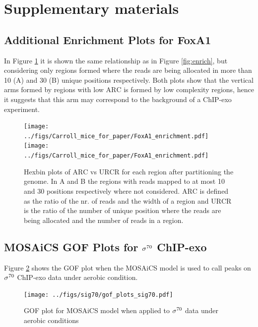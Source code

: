 \documentclass[11pt]{article}\usepackage[]{graphicx}\usepackage[]{color}
\begin{document}
\newpage

\section*{Supplementary materials}
\label{sec:supp}

\subsection*{Additional Enrichment Plots for FoxA1}
\label{sec:enrichsup}

In Figure \ref{fig:enrich2} it is shown the same relationship as in
Figure \ref{fig:enrich}, but considering only regions formed where the
reads are being allocated in more than 10 (A) and 30 (B) unique
positions respectively. Both plots show that the vertical arms formed
by regions with low $\mbox{ARC}$ is formed by low complexity regions,
hence it suggests that this arm may correspond to the background of a
ChIP-exo experiment.

\begin{figure}[h!]
  \centering
  \texttt{[image: ../figs/Carroll\_mice\_for\_paper/FoxA1\_enrichment.pdf]}
  \texttt{[image: ../figs/Carroll\_mice\_for\_paper/FoxA1\_enrichment.pdf]}
  \caption{Hexbin plots of $\mbox{ARC}$ vs $\mbox{URCR}$ for each
    region after partitioning the genome. In A and B the regions with
    reads mapped to at most 10 and 30 positions respectively where not
    considered. $\mbox{ARC}$ is defined as the ratio of the nr. of
    reads and the width of a region and $\mbox{URCR}$ is the ratio of
    the number of unique position where the reads are being allocated
    and the number of reads in a region.}
  \label{fig:enrich2}
\end{figure}


\subsection*{MOSAiCS GOF Plots for $\sigma^{70}$ ChIP-exo}

Figure \ref{fig:mosaics_exo} shows the GOF plot when the MOSAiCS model
is used to call peaks on $\sigma^{70}$ ChIP-exo data under aerobic condition.

\begin{figure}[H]
  \centering
  \texttt{[image: ../figs/sig70/gof\_plots\_sig70.pdf]}
  \caption{GOF plot for MOSAiCS model when applied to $\sigma^{70}$ data under aerobic conditions}
  \label{fig:mosaics_exo}
\end{figure}
\end{document}
